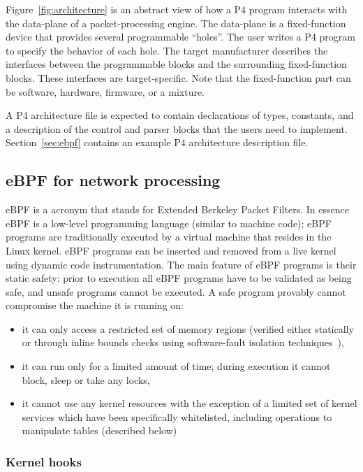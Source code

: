 Figure~\ref{fig:architecture} is an abstract view of how a P4 program
interacts with the data-plane of a packet-processing engine.  The
data-plane is a fixed-function device that provides several
programmable ``holes''.  The user writes a P4 program to specify the
behavior of each hole.  The target manufacturer describes the
interfaces between the programmable blocks and the surrounding
fixed-function blocks.  These interfaces are target-specific.  Note
that the fixed-function part can be software, hardware, firmware, or a
mixture.

A P4 architecture file is expected to contain declarations of types,
constants, and a description of the control and parser blocks that the
users need to implement.  Section~\ref{sec:ebpf} contains an example
P4 architecture description file.

\subsection{eBPF for network processing}

eBPF is a
acronym that stands for Extended Berkeley Packet Filters. In essence
eBPF is a low-level programming language (similar to machine code);
eBPF programs are traditionally executed by a virtual machine that
resides in the Linux kernel. eBPF programs can be inserted and removed
from a live kernel using dynamic code instrumentation. The main
feature of eBPF programs is their static safety: prior to execution
all eBPF programs have to be validated as being safe, and unsafe
programs cannot be executed. A safe program provably cannot compromise
the machine it is running on:
\begin{itemize}
\item it can only access a restricted set of memory regions (verified
  either statically or through inline bounds checks using
  software-fault isolation techniques~\cite{wahbe:93}),
\item it can run only for a limited amount of time; during execution
  it cannot block, sleep or take any locks,
\item it cannot use any kernel resources with the exception of a
  limited set of kernel services which have been specifically
  whitelisted, including operations to manipulate tables (described
  below)
\end{itemize}

\subsubsection{Kernel hooks}

